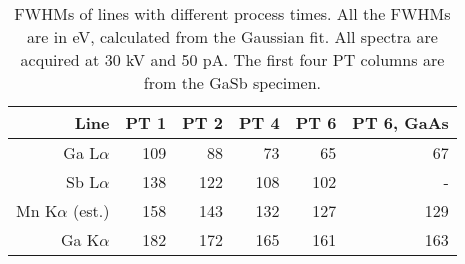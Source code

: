 \begin{table}[phtb]
    \begin{center}
        \caption{
            FWHMs of lines with different process times.
            All the FWHMs are in eV, calculated from the Gaussian fit.
            All spectra are acquired at 30 kV and 50 pA.
            The first four PT columns are from the GaSb specimen.
        }
        \renewcommand*{\arraystretch}{1.4}
        \label{tab:results:PTvsFWHMs}
        \begin{tabular}{rrrrrr}
            \hline
            \textbf{Line}       & \textbf{PT 1} & \textbf{PT 2} & \textbf{PT 4} & \textbf{PT 6} & \textbf{PT 6, GaAs} \\
            \hline
            Ga L$\alpha$        & 109           & 88            & 73            & 65            & 67                  \\
            Sb L$\alpha$        & 138           & 122           & 108           & 102           & -                   \\
            Mn K$\alpha$ (est.) & 158           & 143           & 132           & 127           & 129                 \\
            Ga K$\alpha$        & 182           & 172           & 165           & 161           & 163                 \\
            \hline
        \end{tabular}
    \end{center}
\end{table}
